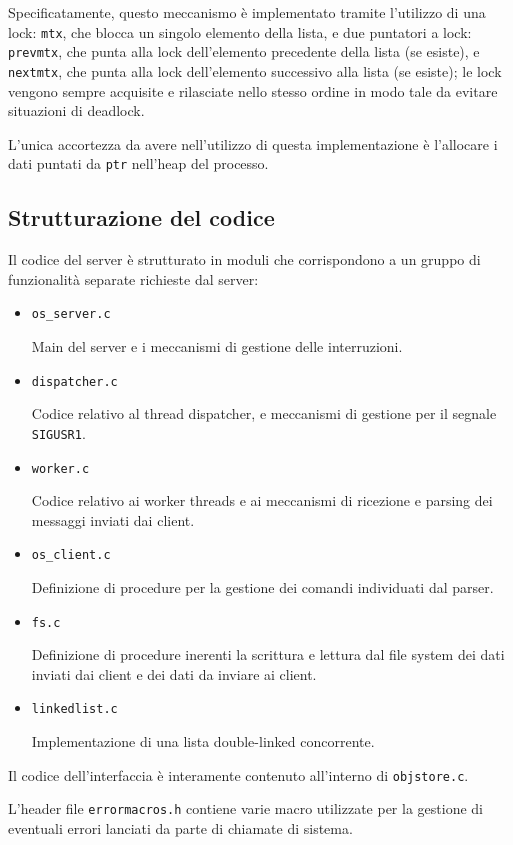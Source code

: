 \documentclass[a4paper,11pt]{article}
\begin{document}
Specificatamente, questo meccanismo è implementato tramite l'utilizzo di una lock: \texttt{mtx}, che blocca un singolo elemento della lista, e due puntatori a lock:
\texttt{prevmtx}, che punta alla lock dell'elemento precedente della lista (se esiste), e \texttt{nextmtx}, che punta alla lock dell'elemento successivo alla lista (se esiste);
le lock vengono sempre acquisite e rilasciate nello stesso ordine in modo tale da evitare situazioni di deadlock.

L'unica accortezza da avere nell'utilizzo di questa implementazione è l'allocare i dati puntati da \texttt{ptr} nell'heap del processo.
\newpage
\subsection{Strutturazione del codice}
Il codice del server è strutturato in moduli che corrispondono a un gruppo di funzionalità separate richieste dal server:
\begin{itemize}
    \item \texttt{os\_server.c}
    
    Main del server e i meccanismi di gestione delle interruzioni.
    \item \texttt{dispatcher.c}
    
    Codice relativo al thread dispatcher, e meccanismi di gestione per il segnale \texttt{SIGUSR1}.
    \item \texttt{worker.c}
    
    Codice relativo ai worker threads e ai meccanismi di ricezione e parsing dei messaggi inviati dai client.

    \item \texttt{os\_client.c}
    
    Definizione di procedure per la gestione dei comandi individuati dal parser.
    
    \item \texttt{fs.c}
    
    Definizione di procedure inerenti la scrittura e lettura dal file system dei dati inviati dai client e dei dati da inviare ai client.
    
    \item \texttt{linkedlist.c}
    
    Implementazione di una lista double-linked concorrente.
\end{itemize}
\smallskip
Il codice dell'interfaccia è interamente contenuto all'interno di \texttt{objstore.c}.

L'header file \texttt{errormacros.h} contiene varie macro utilizzate per la gestione di eventuali errori lanciati da parte di chiamate di sistema.
\end{document}
